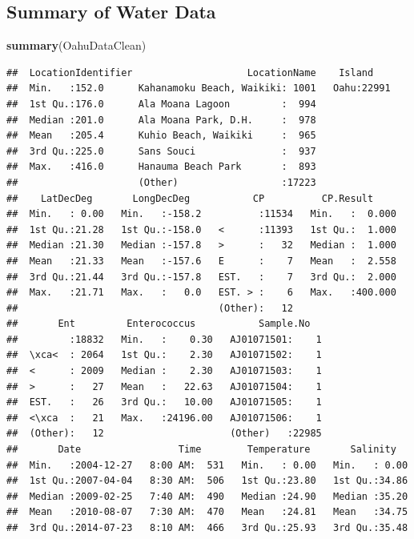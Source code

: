 \documentclass[12pt,]{article}
\newenvironment{Shaded}{\begin{snugshade}}{\end{snugshade}}
\newcommand{\KeywordTok}[1]{\textcolor[rgb]{0.13,0.29,0.53}{\textbf{#1}}}
\newcommand{\NormalTok}[1]{#1}
\begin{document}
\subsection{Summary of Water Data}\label{summary-of-water-data}

\begin{Shaded}
\begin{Highlighting}[]
\KeywordTok{summary}\NormalTok{(OahuDataClean)}
\end{Highlighting}
\end{Shaded}

\begin{verbatim}
##  LocationIdentifier                    LocationName    Island     
##  Min.   :152.0      Kahanamoku Beach, Waikiki: 1001   Oahu:22991  
##  1st Qu.:176.0      Ala Moana Lagoon         :  994               
##  Median :201.0      Ala Moana Park, D.H.     :  978               
##  Mean   :205.4      Kuhio Beach, Waikiki     :  965               
##  3rd Qu.:225.0      Sans Souci               :  937               
##  Max.   :416.0      Hanauma Beach Park       :  893               
##                     (Other)                  :17223               
##    LatDecDeg       LongDecDeg           CP          CP.Result      
##  Min.   : 0.00   Min.   :-158.2          :11534   Min.   :  0.000  
##  1st Qu.:21.28   1st Qu.:-158.0   <      :11393   1st Qu.:  1.000  
##  Median :21.30   Median :-157.8   >      :   32   Median :  1.000  
##  Mean   :21.33   Mean   :-157.6   E      :    7   Mean   :  2.558  
##  3rd Qu.:21.44   3rd Qu.:-157.8   EST.   :    7   3rd Qu.:  2.000  
##  Max.   :21.71   Max.   :   0.0   EST. > :    6   Max.   :400.000  
##                                   (Other):   12                    
##       Ent         Enterococcus           Sample.No    
##         :18832   Min.   :    0.30   AJ01071501:    1  
##  \xca<  : 2064   1st Qu.:    2.30   AJ01071502:    1  
##  <      : 2009   Median :    2.30   AJ01071503:    1  
##  >      :   27   Mean   :   22.63   AJ01071504:    1  
##  EST.   :   26   3rd Qu.:   10.00   AJ01071505:    1  
##  <\xca  :   21   Max.   :24196.00   AJ01071506:    1  
##  (Other):   12                      (Other)   :22985  
##       Date                 Time        Temperature       Salinity    
##  Min.   :2004-12-27   8:00 AM:  531   Min.   : 0.00   Min.   : 0.00  
##  1st Qu.:2007-04-04   8:30 AM:  506   1st Qu.:23.80   1st Qu.:34.86  
##  Median :2009-02-25   7:40 AM:  490   Median :24.90   Median :35.20  
##  Mean   :2010-08-07   7:30 AM:  470   Mean   :24.81   Mean   :34.75  
##  3rd Qu.:2014-07-23   8:10 AM:  466   3rd Qu.:25.93   3rd Qu.:35.48  

\end{verbatim}
\end{document}
